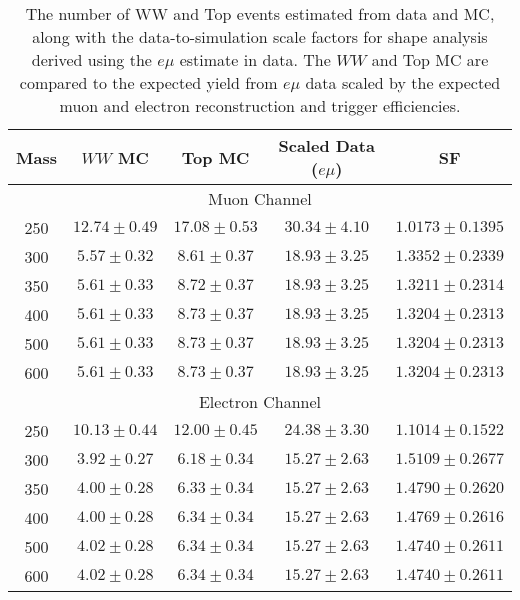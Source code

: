 \begin{table}[!ht]
\begin{center}
\small{
\begin{tabular}{c|c|c|c|c} 
\hline
Mass &   $WW$ MC           & Top MC            & Scaled Data ($e\mu$)   & SF \\
\hline \hline
\multicolumn{5}{c}{Muon Channel} \\ 
\hline \hline
250 & $12.74 \pm 0.49$ & $17.08 \pm 0.53$ & $30.34 \pm 4.10$  & $1.0173 \pm 0.1395$ \\ \hline 
300 & $5.57 \pm 0.32$ & $8.61 \pm 0.37$ & $18.93 \pm 3.25$  & $1.3352 \pm 0.2339$ \\ \hline 
350 & $5.61 \pm 0.33$ & $8.72 \pm 0.37$ & $18.93 \pm 3.25$  & $1.3211 \pm 0.2314$ \\ \hline 
400 & $5.61 \pm 0.33$ & $8.73 \pm 0.37$ & $18.93 \pm 3.25$  & $1.3204 \pm 0.2313$ \\ \hline 
500 & $5.61 \pm 0.33$ & $8.73 \pm 0.37$ & $18.93 \pm 3.25$  & $1.3204 \pm 0.2313$ \\ \hline 
600 & $5.61 \pm 0.33$ & $8.73 \pm 0.37$ & $18.93 \pm 3.25$  & $1.3204 \pm 0.2313$ \\ 
\hline \hline
\multicolumn{5}{c}{Electron Channel} \\ 
\hline \hline
250 & $10.13 \pm 0.44$ & $12.00 \pm 0.45$ & $24.38 \pm 3.30$  & $1.1014 \pm 0.1522$ \\ \hline
300 & $3.92 \pm 0.27$ & $6.18 \pm 0.34$ & $15.27 \pm 2.63$  & $1.5109 \pm 0.2677$ \\ \hline
350 & $4.00 \pm 0.28$ & $6.33 \pm 0.34$ & $15.27 \pm 2.63$  & $1.4790 \pm 0.2620$ \\ \hline
400 & $4.00 \pm 0.28$ & $6.34 \pm 0.34$ & $15.27 \pm 2.63$  & $1.4769 \pm 0.2616$ \\ \hline
500 & $4.02 \pm 0.28$ & $6.34 \pm 0.34$ & $15.27 \pm 2.63$  & $1.4740 \pm 0.2611$ \\ \hline
600 & $4.02 \pm 0.28$ & $6.34 \pm 0.34$ & $15.27 \pm 2.63$  & $1.4740 \pm 0.2611$ \\ \hline 
\end{tabular}
\caption{The number of WW and Top events estimated from data and MC, along with the data-to-simulation 
scale factors for shape analysis derived using the $e\mu$ estimate in data.
The $WW$ and Top MC are compared to the expected yield from $e\mu$ data scaled by the expected muon
and electron reconstruction and trigger efficiencies.}
\label{tab:shape_sf_emu}}
\end{center}
\end{table}




